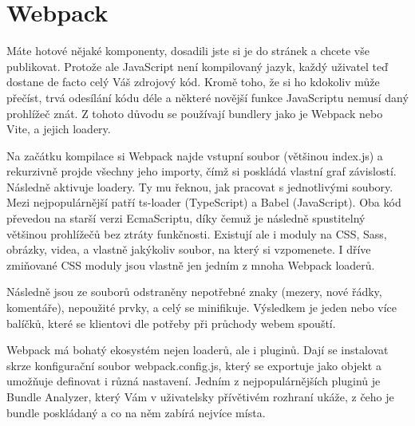 \section{Webpack}

Máte hotové nějaké komponenty, dosadili jste si je do stránek a chcete vše publikovat. Protože ale JavaScript není kompilovaný jazyk, každý uživatel teď dostane de facto celý Váš zdrojový kód. Kromě toho, že si ho kdokoliv může přečíst, trvá odesílání kódu déle a některé novější funkce JavaScriptu nemusí daný prohlížeč znát. Z tohoto důvodu se používají bundlery jako je Webpack\cite{Webpack}\cite{WebpackFireship} nebo Vite, a jejich loadery.

Na začátku kompilace si Webpack najde vstupní soubor (většinou index.js) a rekurzivně projde všechny jeho importy\cite{WebpackConcepts}\cite{WebpackFounder}, čímž si poskládá vlastní graf závislostí\cite{WebpackDependency}. Následně aktivuje loadery. Ty mu řeknou, jak pracovat s jednotlivými soubory. Mezi nejpopulárnější patří ts-loader (TypeScript) a Babel (JavaScript). Oba kód převedou na starší verzi EcmaScriptu, díky čemuž je následně spustitelný většinou prohlížečů bez ztráty funkčnosti. Existují ale i moduly na CSS, Sass, obrázky, videa, a vlastně jakýkoliv soubor, na který si vzpomenete. I dříve zmiňované CSS moduly jsou vlastně jen jedním z mnoha Webpack loaderů.

Následně jsou ze souborů odstraněny nepotřebné znaky (mezery, nové řádky, komentáře), nepoužité prvky, a celý se minifikuje. Výsledkem je jeden nebo více balíčků, které se klientovi dle potřeby při průchody webem spouští.

Webpack má bohatý ekosystém nejen loaderů, ale i pluginů. Dají se instalovat skrze konfigurační soubor webpack.config.js, který se exportuje jako objekt a umožňuje definovat i různá nastavení. Jedním z nejpopulárnějších pluginů je Bundle Analyzer, který Vám v uživatelsky přívětivém rozhraní ukáže, z čeho je bundle poskládaný a co na něm zabírá nejvíce místa.